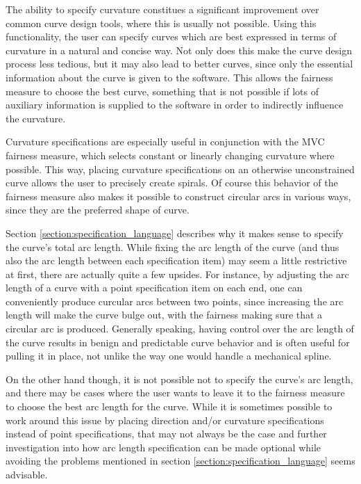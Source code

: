 \documentclass[a4paper]{article}
\begin{document}
				The ability to specify curvature constitues a significant improvement over common curve design tools, where this is usually not possible. Using this functionality, the user can specify curves which are best expressed in terms of curvature in a natural and concise way. Not only does this make the curve design process less tedious, but it may also lead to better curves, since only the essential information about the curve is given to the software. This allows the fairness measure to choose the best curve, something that is not possible if lots of auxiliary information is supplied to the software in order to indirectly influence the curvature.

				Curvature specifications are especially useful in conjunction with the MVC fairness measure, which selects constant or linearly changing curvature where possible. This way, placing curvature specifications on an otherwise unconstrained curve allows the user to precisely create spirals. Of course this behavior of the fairness measure also makes it possible to construct circular arcs in various ways, since they are the preferred shape of curve.

				Section \ref{section:specification_language} describes why it makes sense to specify the curve's total arc length. While fixing the arc length of the curve (and thus also the arc length between each specification item) may seem a little restrictive at first, there are actually quite a few upsides. For instance, by adjusting the arc length of a curve with a point specification item on each end, one can conveniently produce curcular arcs between two points, since increasing the arc length will make the curve bulge out, with the fairness making sure that a circular arc is produced. Generally speaking, having control over the arc length of the curve results in benign and predictable curve behavior and is often useful for pulling it in place, not unlike the way one would handle a mechanical spline.

				On the other hand though, it is not possible not to specify the curve's arc length, and there may be cases where the user wants to leave it to the fairness measure to choose the best arc length for the curve. While it is sometimes possible to work around this issue by placing direction and/or curvature specifications instead of point specifications, that may not always be the case and further investigation into how arc length specification can be made optional while avoiding the problems mentioned in section \ref{section:specification_language} seems advisable.
\end{document}
